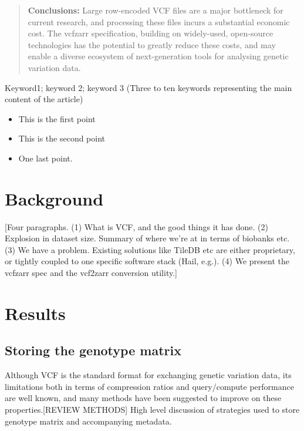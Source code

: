 \documentclass[a4paper,num-refs]{oup-contemporary}
\begin{document}
\begin{frontmatter}
\begin{abstract}
\textbf{Conclusions:}
Large row-encoded VCF files are a major bottleneck for current research, and 
processing these files incurs a substantial economic cost.
The vcfzarr specification, building on widely-used, open-source technologies
has the potential to greatly reduce these costs,
and may enable a diverse ecosystem of next-generation tools for analysing 
genetic variation data.
\end{abstract}

\begin{keywords}
Keyword1; keyword 2; keyword 3 (Three to ten keywords representing the main content of the article)
\end{keywords}
\end{frontmatter}

\begin{keypoints*}
\begin{itemize}
\item This is the first point
\item This is the second point
\item One last point.
\end{itemize}
\end{keypoints*}

\section{Background}
[Four paragraphs. (1) What is VCF, and the good things it has done. 
(2) Explosion in dataset size. Summary of where we're at in terms of biobanks
etc. (3) We have a problem. Existing solutions like TileDB etc
are either proprietary, or tightly coupled to one specific software stack
(Hail, e.g.).
(4) We present the vcfzarr spec and the vcf2zarr conversion utility.]

\section{Results}

\subsection{Storing the genotype matrix}
Although VCF is the standard format for exchanging genetic variation
data, its limitations both in terms of compression ratios
and query/compute performance are well known, and many methods 
have been suggested to improve on these properties.[REVIEW METHODS]
High level discussion of
strategies used to store genotype matrix and accompanying metadata.
\end{document}
